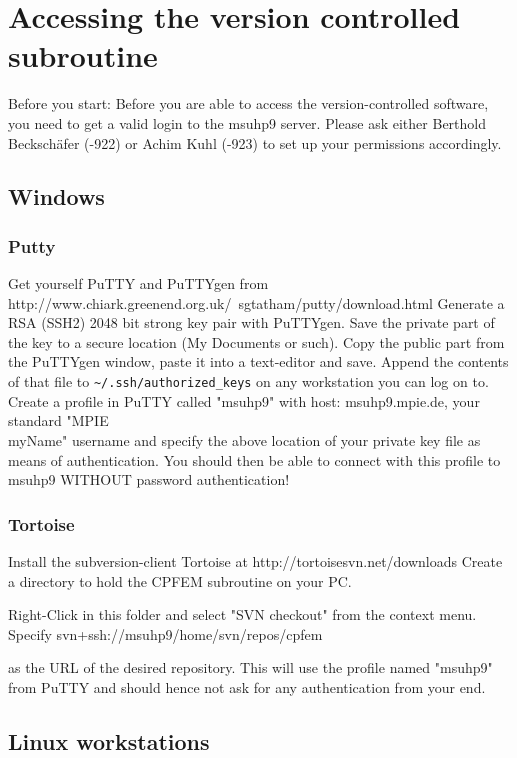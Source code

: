 \section{Accessing the version controlled subroutine}
Before you start: Before you are able to access the version-controlled software, you need to get a valid login to the msuhp9 server. Please ask either Berthold Becksch\"afer (-922) or Achim Kuhl (-923) to set up your permissions accordingly. 

\subsection{Windows}
\subsubsection{Putty}
Get yourself PuTTY and PuTTYgen from http://www.chiark.greenend.org.uk/~sgtatham/putty/download.html 
Generate a RSA (SSH2) 2048 bit strong key pair with PuTTYgen. Save the private part of the key to a secure location (My Documents or such). Copy the public part from the PuTTYgen window, paste it into a text-editor and save. Append the contents of that file to \verb|~/.ssh/authorized_keys| on any workstation you can log on to. 
Create a profile in PuTTY called "msuhp9" with host: msuhp9.mpie.de, your standard "MPIE\\myName" username and specify the above location of your private key file as means of authentication. 
You should then be able to connect with this profile to msuhp9 WITHOUT password authentication! 

\subsubsection{Tortoise}
Install the subversion-client Tortoise at http://tortoisesvn.net/downloads 
Create a directory to hold the CPFEM subroutine on your PC. 

Right-Click in this folder and select "SVN checkout" from the context menu. Specify 
svn+ssh://msuhp9/home/svn/repos/cpfem

as the URL of the desired repository. This will use the profile named "msuhp9" from PuTTY and should hence not ask for any authentication from your end.

\subsection{Linux workstations}

